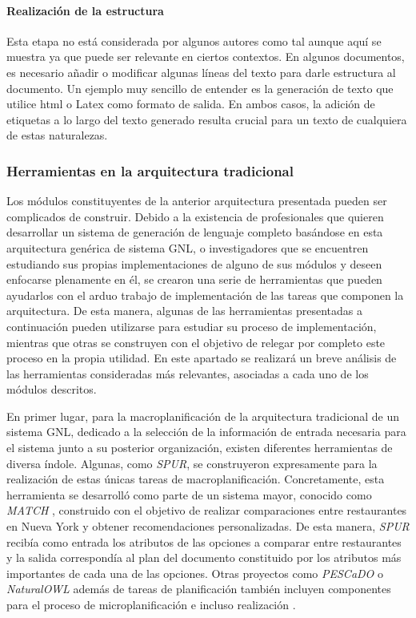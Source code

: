 \paragraph{Realización de la estructura}\hfill

Esta etapa no está considerada por algunos autores como tal aunque aquí se muestra ya que puede ser relevante en ciertos contextos. 
En algunos documentos, es necesario añadir o modificar algunas líneas del texto para darle estructura al documento. Un ejemplo muy sencillo de entender es la generación de texto que utilice html o Latex como formato de salida. En ambos casos, la adición de etiquetas a lo largo del texto generado resulta crucial para un texto de cualquiera de estas naturalezas.

\subsubsection{Herramientas en la arquitectura tradicional}
Los módulos constituyentes de la anterior arquitectura presentada pueden ser complicados de construir. Debido a la existencia  de profesionales que quieren desarrollar un sistema de generación de lenguaje completo basándose en esta arquitectura genérica de sistema GNL, o investigadores que se encuentren estudiando sus propias implementaciones de alguno de sus módulos y deseen enfocarse plenamente en él, se crearon una serie de herramientas que pueden ayudarlos con el arduo trabajo de implementación de las tareas que componen la arquitectura. De esta manera, algunas de las herramientas presentadas a continuación pueden utilizarse para estudiar su proceso de implementación, mientras que otras se construyen con el objetivo de relegar por completo este proceso en la propia utilidad. En este apartado se realizará un breve análisis de las herramientas consideradas más relevantes, asociadas a cada uno de los módulos descritos.

En primer lugar, para la macroplanificación de la arquitectura tradicional de un sistema GNL, dedicado a la selección de la información de entrada necesaria para el sistema junto a su posterior organización, existen diferentes herramientas de diversa índole. Algunas, como \textit{SPUR}, se construyeron expresamente para la realización de estas únicas tareas de macroplanificación. Concretamente, esta herramienta se desarrolló como parte de un sistema mayor, conocido como \textit{MATCH} \citep{johnston-etal-2002-match}, construido con el objetivo de realizar comparaciones entre restaurantes en Nueva York y obtener recomendaciones personalizadas. De esta manera, \textit{SPUR} recibía como entrada los atributos de las opciones a comparar entre restaurantes y la salida correspondía al plan del documento constituido por los atributos más importantes de cada una de las opciones. Otras proyectos como \textit{PESCaDO} \citep{pescado} o \textit{NaturalOWL} \citep{Androutsopoulos_2014} además de tareas de planificación también incluyen componentes para el proceso de microplanificación e incluso realización .


